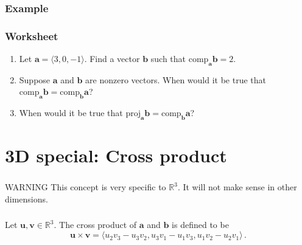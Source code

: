 \documentclass[aspectratio=169]{beamer}
\newcommand{\vectorproj}[2][]{\mathrm{proj}_{\vect{#1}}\vect{#2}}
\newcommand{\vectorcomp}[2][]{\mathrm{comp}_{\vect{#1}}\vect{#2}}
\newcommand{\vect}{\mathbf}
\begin{document}
\begin{frame}
    \frametitle{Example}

\end{frame}

\begin{frame}
    \frametitle{Worksheet}
    \begin{enumerate}
        \item Let $\vect{a} = \langle 3,0,-1\rangle$. Find a vector
            $\vect{b}$ such that $\vectorcomp[a]{b} = 2$.
        \item
         Suppose $\vect{a}$ and $\vect{b}$ are nonzero vectors.
            When would it be true that $\vectorcomp[a]{b} = \vectorcomp[b]{a}$?
        \item When would it be true that 
                 $\vectorproj[a]{b} = \vectorcomp[b]{a}$?
    \end{enumerate}
\end{frame}

\section{3D special: Cross product}

\begin{frame}
    \frametitle{\secname}
    \begin{block}{WARNING}
This concept is very specific to \(\mathbb{R}^3\).
It will not make sense in other dimensions.
    \end{block}
\end{frame}

\begin{frame}
    \frametitle{\secname}
\begin{definition}
Let \(\mathbf{u}, \mathbf{v} \in \mathbb{R}^3\).
The cross product of \(\mathbf{a}\) and \(\mathbf{b}\) is defined to be
\begin{equation*}
    \mathbf{u} \times \mathbf{v} = \langle u_2 v_3 - u_3 v_2, u_3v_1 - u_1 v_3, u_1v_2 - u_2v_1 \rangle \,.
\end{equation*}
\end{definition}
\end{frame}
  
\end{document}
